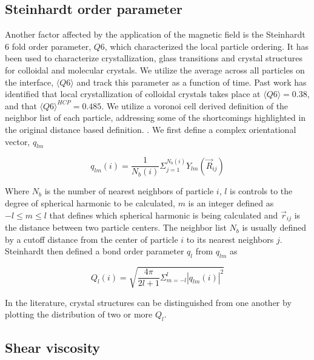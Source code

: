 \subsection{Steinhardt order parameter}
\label{section:steinhardt_order_parameter}

Another factor affected by the application of the magnetic field is the Steinhardt 6 fold order parameter, $Q6$, which characterized the local 
particle ordering. \cite{steinhardt_bond-orientational_1983} It has been used to characterize crystallization, glass transitions and crystal 
structures for colloidal and molecular crystals. We utilize the average across all particles on the interface, $\langle Q6 \rangle$ and track 
this parameter as a function of time. Past work has identified that local crystallization of colloidal crystals takes place at $\langle Q6 \rangle = 0.38$, 
and that $\langle Q6 \rangle^{HCP} = 0.485$. \cite{steinhardt_bond-orientational_1983, toxvaerd_role_2020, mickel_shortcomings_2013} We utilize a voronoi 
cell derived definition of the neighbor list of each particle, addressing some of the shortcomings highlighted in the original distance based definition. 
\cite{steinhardt_bond-orientational_1983, mickel_shortcomings_2013}. We first define a complex orientational vector, $q_{lm}$

\begin{equation}
q_{lm}(i) = \frac{1}{N_b(i)} \Sigma_{j = 1}^{N_b(i)} Y_{lm}(\vec{R}_{ij})
\end{equation}

Where $N_b$ is the number of nearest neighbors of particle $i$, $l$ is controls to the degree of spherical harmonic to be calculated, $m$ is an integer 
defined as $-l \leq m \leq l$ that defines which spherical harmonic is being calculated and $\vec{r}_{ij}$ is the distance between two particle centers. 
The neighbor list $N_b$ is usually defined by a cutoff distance from the center of particle $i$ to its nearest neighbors $j$. Steinhardt then defined a 
bond order parameter $q_l$ from $q_{lm}$ as

\begin{equation}
Q_{l}(i) = \sqrt{\frac{4 \pi}{2l + 1} \Sigma_{m = -l}^{l} |q_{lm}(i)|^2}
\end{equation}

In the literature, crystal structures can be distinguished from one another by plotting the distribution of two or more $Q_{l}$.


\subsection{Shear viscosity}
\label{section:shear_viscosity}

